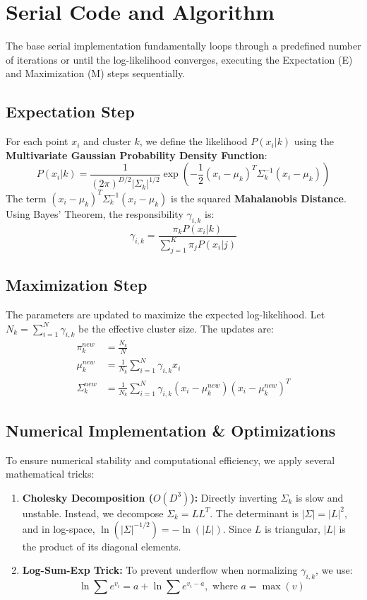 \documentclass[10pt]{article}
\begin{document}
\section{Serial Code and Algorithm}
The base serial implementation fundamentally loops through a predefined number of iterations or until the log-likelihood converges, executing the Expectation (E) and Maximization (M) steps sequentially.

\subsection{Expectation Step}
For each point $x_i$ and cluster $k$, we define the likelihood $P(x_i | k)$ using the \textbf{Multivariate Gaussian Probability Density Function}:
\begin{equation}
P(x_i | k) = \frac{1}{(2\pi)^{D/2} |\Sigma_k|^{1/2}} \exp\left( -\frac{1}{2} (x_i - \mu_k)^T \Sigma_k^{-1} (x_i - \mu_k) \right)
\end{equation}
The term $(x_i - \mu_k)^T \Sigma_k^{-1} (x_i - \mu_k)$ is the squared \textbf{Mahalanobis Distance}. Using Bayes' Theorem, the responsibility $\gamma_{i,k}$ is:
\begin{equation}
\gamma_{i,k} = \frac{\pi_k P(x_i | k)}{\sum_{j=1}^K \pi_j P(x_i | j)}
\end{equation}

\subsection{Maximization Step}
The parameters are updated to maximize the expected log-likelihood. Let $N_k = \sum_{i=1}^N \gamma_{i,k}$ be the effective cluster size. The updates are:
\begin{align}
\pi_k^{new} &= \frac{N_k}{N} \\
\mu_k^{new} &= \frac{1}{N_k} \sum_{i=1}^N \gamma_{i,k} x_i \\
\Sigma_k^{new} &= \frac{1}{N_k} \sum_{i=1}^N \gamma_{i,k} (x_i - \mu_k^{new})(x_i - \mu_k^{new})^T
\end{align}

\subsection{Numerical Implementation \& Optimizations}
To ensure numerical stability and computational efficiency, we apply several mathematical tricks:
\begin{enumerate}
    \item \textbf{Cholesky Decomposition ($O(D^3)$):} Directly inverting $\Sigma_k$ is slow and unstable. Instead, we decompose $\Sigma_k = L L^T$. The determinant is $|\Sigma| = |L|^2$, and in log-space, $\ln(|\Sigma|^{-1/2}) = -\ln(|L|)$. Since $L$ is triangular, $|L|$ is the product of its diagonal elements.
    \item \textbf{Log-Sum-Exp Trick:} To prevent underflow when normalizing $\gamma_{i,k}$, we use:
    \begin{equation}
    \ln\sum e^{v_i} = a + \ln\sum e^{v_i - a}, \text{ where } a = \max(v)
    \end{equation}
\end{enumerate}
\end{document}
